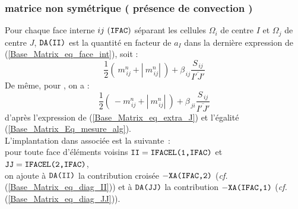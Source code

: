 \subsubsection*{matrice non symétrique ( présence de convection ) }
Pour chaque face interne $ij\ ( \text{\texttt{IFAC}} )$ séparant les cellules $\Omega_i$
de centre $I$ et $\Omega_j$ de centre $J$, $\text{\texttt{DA(II)}}$ est la quantité en facteur de $a_I$ dans la
dernière expression de (\ref{Base_Matrix_eq_face_int}), soit :
\begin{equation}\label{Base_Matrix_eq_diag_II}
\displaystyle\frac{1}{2}(\ m_{\,ij}^n + |\ m_{\,ij}^n|\ )+\displaystyle
\beta_{\,ij}\frac {S_{\,ij}}{\overline{I'J'}}
\end{equation}
De même, pour , on a :
\begin{equation}\label{Base_Matrix_eq_diag_JJ}
\displaystyle\frac{1}{2}(\ - m_{\,ij}^n + |\ m_{\,ij}^n|\ )+\displaystyle
\beta_{\,ji}\frac {S_{\,ij}}{\overline{I'J'}}
\end{equation}
d'après l'expression de (\ref{Base_Matrix_eq_extra_J}) et l'égalité (\ref{Base_Matrix_Eq_mesure_alg}).\\
L'implantation dans \CS associée est la suivante~:\\
pour toute face  d'éléments voisins $\text{\texttt{II}} =
\text{\texttt{IFACEL(1,IFAC)}}$ et $\text{\texttt{JJ}} = \text{\texttt{IFACEL(2,IFAC)}}$,\\
on ajoute à
$\text{\texttt{DA(II)}}$ la contribution croisée $-\text{\texttt{XA(IFAC,2)}}$ ({\it cf.}
(\ref{Base_Matrix_eq_diag_II}))  et
à
$\text{\texttt{DA(JJ)}}$ la contribution $-\text{\texttt{XA(IFAC,1)}}$ ({\it cf.}
(\ref{Base_Matrix_eq_diag_JJ})).
